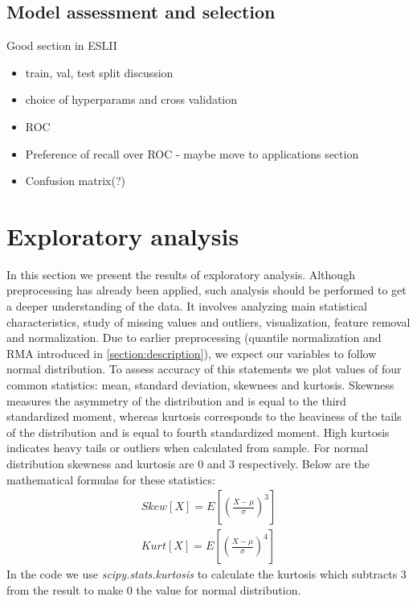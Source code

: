 \documentclass[12pt, wide]{mwart}
\begin{document}
\subsection{Model assessment and selection} \label{section:selection}

Good section in ESLII


\begin{itemize}
    \item train, val, test split discussion 
    \item choice of hyperparams and cross validation
    \item ROC
    \item Preference of recall over ROC  - maybe move to applications section
    \item Confusion matrix(?)
\end{itemize}


\section{Exploratory analysis}

In this section we present the results of exploratory analysis. Although preprocessing has already been applied, such analysis should be performed to get a deeper understanding of the data. It involves analyzing main statistical characteristics, study of missing values and outliers, visualization, feature removal and normalization. Due to earlier preprocessing (quantile normalization and RMA introduced in \ref{section:description}), we expect our variables to follow normal distribution. To assess accuracy of this statements we plot values of four common statistics: mean, standard deviation, skewnees and kurtosis. Skewness measures the asymmetry of the distribution and is equal to the third standardized moment, whereas kurtosis corresponds to the heaviness of the tails of the distribution and is equal to fourth standardized moment. High kurtosis indicates heavy tails or outliers when calculated from sample. For normal distribution skewness and kurtosis are $0$ and $3$ respectively. Below are the mathematical formulas for these statistics:
\begin{align}
    Skew[X] = E\left[\left(\frac{X-\mu}{\sigma}\right)^3 \right] \nonumber \\
    Kurt[X] = E\left[\left(\frac{X-\mu}{\sigma}\right)^4 \right] \nonumber
\end{align}
In the code we use \textit{scipy.stats.kurtosis} to calculate the kurtosis which subtracts $3$ from the result to make $0$ the value for normal distribution. 
\end{document}
